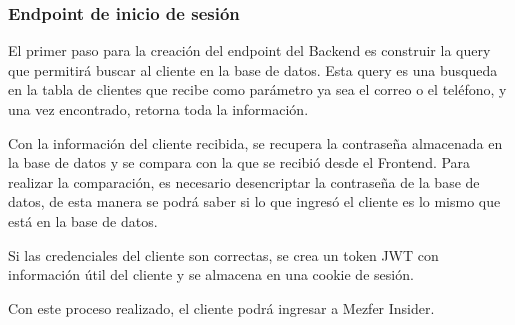 \subsubsection{Endpoint de inicio de sesión}
El primer paso para la creación del endpoint del Backend es construir la query que permitirá buscar al cliente en la base de datos. Esta query es una busqueda en la tabla de clientes que recibe como parámetro ya sea el correo o el teléfono, y una vez encontrado, retorna toda la información.

Con la información del cliente recibida, se recupera la contraseña almacenada en la base de datos y se compara con la que se recibió desde el Frontend. Para realizar la comparación, es necesario desencriptar la contraseña de la base de datos, de esta manera se podrá saber si lo que ingresó el cliente es lo mismo que está en la base de datos.

Si las credenciales del cliente son correctas, se crea un token JWT con información útil del cliente y se almacena en una cookie de sesión.

Con este proceso realizado, el cliente podrá ingresar a Mezfer Insider.